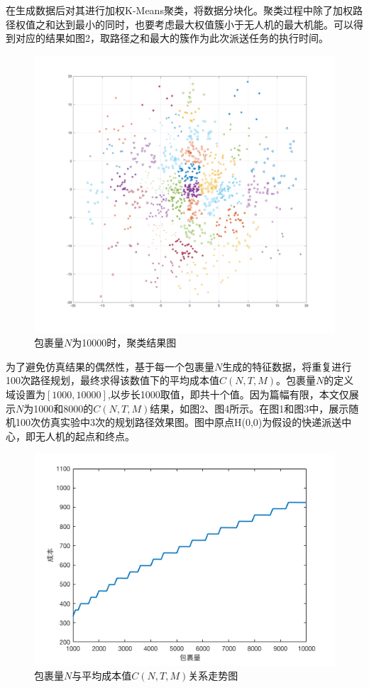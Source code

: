 \documentclass[10.5pt,twocolumn]{jbuaa}
\begin{document}
	在生成数据后对其进行加权K-Means聚类，将数据分块化。聚类过程中除了加权路径权值之和达到最小的同时，也要考虑最大权值簇小于无人机的最大机能。可以得到对应的结果如图2，取路径之和最大的簇作为此次派送任务的执行时间。

	\begin{figure}
		\centering
		\includegraphics[scale=0.11]{Figs/uavAfter.png}
		\caption{包裹量$N$为10000时，聚类结果图}
		\label{fig:02}
	\end{figure}



	为了避免仿真结果的偶然性，基于每一个包裹量$N$生成的特征数据，将重复进行100次路径规划，最终求得该数值下的平均成本值$C(N,T,M)$。包裹量$N$的定义域设置为$[1000,10000]$,以步长1000取值，即共十个值。因为篇幅有限，本文仅展示$N$为1000和8000的$C(N,T,M)$结果，如图2、图4所示。在图1和图3中，展示随机100次仿真实验中3次的规划路径效果图。图中原点H(0,0)为假设的快递派送中心，即无人机的起点和终点。

	\begin{figure}[!h]
	\centering
	\includegraphics[scale=0.4]{Figs/uavResult.png}
	\caption{包裹量$N$与平均成本值$C(N,T,M)$关系走势图}
	\label{fig:06}
	\end{figure}
\end{document}
